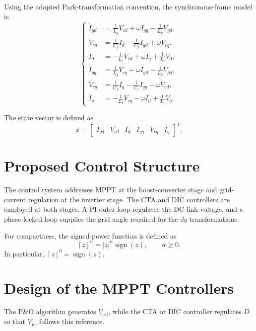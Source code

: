 \documentclass[preprint,12pt]{elsarticle}
\begin{document}
Using the adopted Park-transformation convention, the synchronous-frame model is
\begin{equation}
\left\{
\begin{aligned}
\dot I_{gd}&=\frac{1}{L_g}V_{cd}+\omega I_{gq}-\frac{1}{L_g}V_{gd},\\
\dot V_{cd}&=\frac{1}{C_f}I_d-\frac{1}{C_f}I_{gd}+\omega V_{cq},\\
\dot I_d&=-\frac{1}{L_i}V_{cd}+\omega I_q+\frac{1}{L_i}V_d,\\
\dot I_{gq}&=\frac{1}{L_g}V_{cq}-\omega I_{gd}-\frac{1}{L_g}V_{gq},\\
\dot V_{cq}&=\frac{1}{C_f}I_q-\frac{1}{C_f}I_{gq}-\omega V_{cd},\\
\dot I_q&=-\frac{1}{L_i}V_{cq}-\omega I_d+\frac{1}{L_i}V_q.
\end{aligned}
\right.
\label{eq:dq-model}
\end{equation}

The state vector is defined as
\begin{equation}
x=\begin{bmatrix}I_{gd}&V_{cd}&I_d&I_{gq}&V_{cq}&I_q\end{bmatrix}^{T}.
\label{eq:state-vector}
\end{equation}

\section{Proposed Control Structure}
\label{sec:proposed}

The control system addresses MPPT at the boost-converter stage and grid-current regulation at the inverter stage. The CTA and DIC controllers are employed at both stages. A PI outer loop regulates the DC-link voltage, and a phase-locked loop supplies the grid angle required for the $dq$ transformations.

For compactness, the signed-power function is defined as
\begin{equation}
\left\lceil z\right\rfloor^{\alpha}=|z|^{\alpha}\operatorname{sign}(z),\qquad \alpha\geq0.
\label{eq:signed-power}
\end{equation}
In particular, $\left\lceil z\right\rfloor^0=\operatorname{sign}(z)$.

\section{Design of the MPPT Controllers}
\label{sec:mppt}

The P\&O algorithm generates $V_{\mathrm{ref}}$, while the CTA or DIC controller regulates $D$ so that $V_{pv}$ follows this reference.
\end{document}
